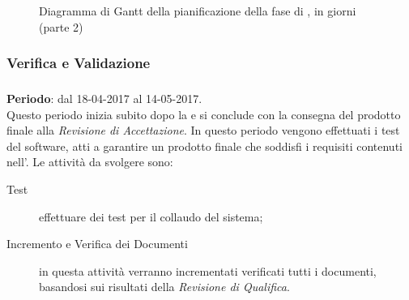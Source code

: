 \begin{figure}[H]
\label{tab:ganttpa1}
\caption{Diagramma di Gantt della pianificazione della fase di \PDC, in giorni (parte 2)}
\end{figure}


	\subsubsection{Verifica e Validazione} \label{sec:VV}

	\subsubsection{\VV} \label{sec:VV}
	\textbf{Periodo}: dal 18-04-2017 al 14-05-2017.
	\\ Questo periodo inizia subito dopo la \PDC{} e si conclude con la consegna del prodotto finale alla \emph{Revisione di Accettazione}. In questo periodo vengono effettuati i test del software, atti a garantire un prodotto finale che soddisfi i requisiti contenuti nell'\AR. Le attività da svolgere sono:
	\begin{description}
		\item[Test] effettuare dei test per il collaudo del sistema;
		\item[Incremento e Verifica dei Documenti] in questa attività verranno incrementati verificati tutti i documenti, basandosi sui risultati della \emph{Revisione di Qualifica}.
	\end{description}		
	
